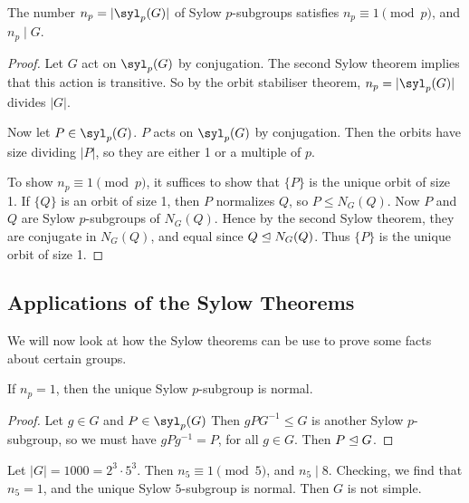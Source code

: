 \documentclass[a4paper]{scrartcl}
\begin{document}
\begin{theorem}
	The number $n_p = |\syl_p(G)|$ of Sylow $p$-subgroups satisfies $n_p \equiv 1 \pmod{p}$, and $n_p \mid G$. 
\end{theorem}
\begin{proof}
	Let $G$ act on $\syl_p(G)$ by conjugation. The second Sylow theorem implies that this action is transitive. So by the orbit stabiliser theorem, $n_p = |\syl_p(G)|$ divides $|G|$.

	Now let $P \in \syl_p(G)$. $P$ acts on $\syl_p(G)$ by conjugation. Then the orbits have size dividing $|P|$, so they are either 1 or a multiple of $p$.

	To show $n_p \equiv 1 \pmod{p}$, it suffices to show that $\{P\}$ is the unique orbit of size 1. If $\{Q\}$ is an orbit of size 1, then $P$ normalizes $Q$, so $P \leq N_G(Q)$. Now $P$ and $Q$ are Sylow $p$-subgroups of $N_G(Q)$. Hence by the second Sylow theorem, they are conjugate in $N_G(Q)$, and equal since $Q \trianglelefteq N_G(Q)$. Thus $\{P\}$ is the unique orbit of size 1.
\end{proof}


\subsection{Applications of the Sylow Theorems}

We will now look at how the Sylow theorems can be use to prove some facts about certain groups.

\begin{corollary}
	If $n_p = 1$, then the unique Sylow $p$-subgroup is normal.
\end{corollary}
\begin{proof}
Let $g \in G$ and $P \in \syl_p(G)$ Then $gPG^{-1} \leq G$ is another Sylow $p$-subgroup, so we must have $gPg^{-1} = P$, for all $g \in G$. Then $P \trianglelefteq G$.
\end{proof}

\begin{example}
Let $|G| = 1000 = 2^3 \cdot 5^3$. Then $n_5 \equiv 1 \pmod{5}$, and $n_5 \mid 8$. Checking, we find that $n_5 = 1$, and the unique Sylow $5$-subgroup is normal. Then $G$ is not simple.
\end{example}
\end{document}
